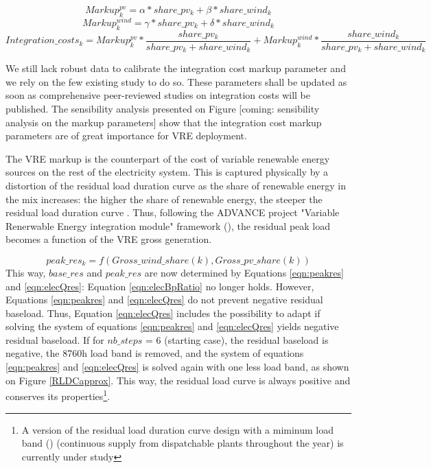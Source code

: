 \begin{dmath}
    Markup^{pv}_k = \alpha * share\_pv_k + \beta * share\_wind_k
\end{dmath}
\begin{dmath}
    Markup^{wind}_k = \gamma * share\_pv_k + \delta * share\_wind_k
\end{dmath}
\begin{dmath}
    Integration\_costs_k = Markup^{pv}_k * 
    \frac{share\_pv_k}{share\_pv_k + share\_wind_k} + 
    Markup^{wind}_k * \frac{share\_wind_k}{share\_pv_k + share\_wind_k}
\end{dmath}


We still lack robust data to calibrate the integration cost markup parameter and we rely on the few existing study to do so. These parameters shall be updated as soon as comprehensive peer-reviewed studies on integration costs will be published. The sensibility analysis presented on Figure [coming: sensibility analysis on the markup parameters] show that the integration cost markup parameters are of great importance for VRE deployment.

The VRE markup is the counterpart of the cost of variable renewable energy sources on the rest of the electricity system. This is captured physically by a distortion of the residual load duration curve as the share of renewable energy in the mix increases: the higher the share of renewable energy, the steeper the residual load duration curve \cite{Ueckerdt2015}. Thus, following the ADVANCE project "Variable Renerwable Energy integration module" framework (\cite{Ueckerdt2017}), the residual peak load becomes a function of the VRE gross generation.
 
 \begin{dmath}
    {peak\_res_k} = f(Gross\_wind\_share(k),Gross\_pv\_share(k))
    \label{eqn:peakres}
\end{dmath}
 This way, $base\_res$ and $peak\_res$ are now determined by Equations \ref{eqn:peakres} and \ref{eqn:elecQres}: Equation \ref{eqn:elecBpRatio} no longer holds. However, Equations \ref{eqn:peakres} and \ref{eqn:elecQres} do not prevent negative residual baseload. Thus, Equation \ref{eqn:elecQres} includes the possibility to adapt if solving the system of equations \ref{eqn:peakres} and \ref{eqn:elecQres} yields negative residual baseload. If for  $nb\_steps$ = 6 (starting case), the residual baseload is negative, the 8760h load band is removed, and the system of equations \ref{eqn:peakres} and \ref{eqn:elecQres} is solved again with one less load band, as shown on Figure \ref{RLDCapprox}. This way, the residual load curve is always positive and conserves its properties\footnote{A version of the residual load duration curve design with a miminum load band (\cite{Ueckerdt2015}) (continuous supply from dispatchable plants throughout the year) is currently under study}. 

